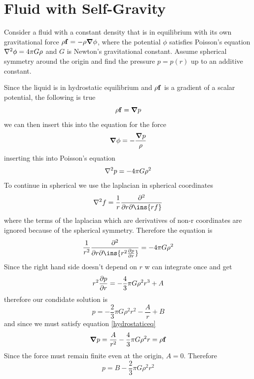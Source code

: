 \clearpage
\section{Fluid with Self-Gravity}
\begin{colbox}
	Consider a fluid with a constant density that is in equilibrium with its own gravitational force \(\rho\vb{f}=-\rho\grad{\phi}\), where the potential \(\phi\) satisfies Poisson's equation \(\laplacian{\phi}=4\pi G \rho\) and \(G\) is Newton's gravitational constant. Assume spherical symmetry around the origin and find the pressure \(p=p(r)\) up to an additive constant.
\end{colbox}
Since the liquid is in hydrostatic equilibrium and \(\rho\vb{f}\) is a gradient of a scalar potential, the following is true 
\begin{equation}\label{hydrostaticeq}
	\rho\vb{f} = \grad{p}
\end{equation}
we can then insert this into the equation for the force
\begin{equation}
	\grad{\phi} = -\frac{\grad{p}}{\rho}
\end{equation}
inserting this into Poisson's equation
\begin{equation}
	\laplacian{p} = -4\pi G \rho^2
\end{equation}
To continue in spherical we use the laplacian in spherical coordinates
\begin{equation}
	\laplacian{f} = \frac{1}{r}\pdv[2]{}{r}\ins{rf}
\end{equation}
where the terms of the laplacian which are derivatives of non-r coordinates are ignored because of the spherical symmetry. Therefore the equation is
\begin{equation}
	\frac{1}{r^2}\pdv{}{r}\ins{r^2\pdv{p}{r}} = -4\pi G \rho^2
\end{equation}
Since the right hand side doesn't depend on \(r\) w can integrate once and get 
\begin{equation}
	r^2\pdv{p}{r} = -\frac{4}{3}\pi G \rho^2 r^3 + A
\end{equation}
therefore our condidate solution is
\begin{equation}
	p = -\frac{2}{3}\pi G \rho^2 r^2 - \frac{A}{r} + B
\end{equation}
and since we must satisfy equation \ref{hydrostaticeq}
\begin{equation}
	\grad{p} = \frac{A}{r^2}-\frac{4}{3}\pi G \rho^2 r  = \rho\vb{f}
\end{equation}
Since the force must remain finite even at the origin, \(A=0\). Therefore
\begin{equation}
	p = B -\frac{2}{3}\pi G \rho^2 r^2
\end{equation}